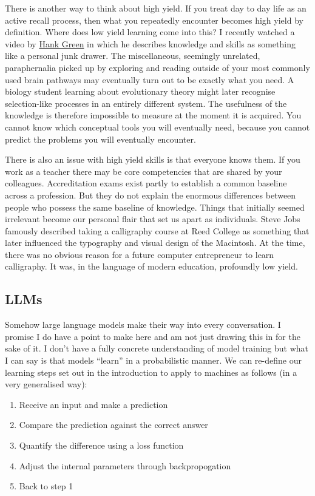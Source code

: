 \documentclass{article}
\begin{document}
There is another way to think about high yield. If you treat day to day life as an active recall process, then what you repeatedly encounter becomes high yield by definition. Where does low yield learning come into this? I recently watched a video by \href{https://www.youtube.com/watch?v=AgBaU9mmceQ}{Hank Green} in which he describes knowledge and skills as something like a personal junk drawer. The miscellaneous, seemingly unrelated, paraphernalia picked up by exploring and reading outside of your most commonly used brain pathways may eventually turn out to be exactly what you need. A biology student learning about evolutionary theory might later recognise selection-like processes in an entirely different system. The usefulness of the knowledge is therefore impossible to measure at the moment it is acquired. You cannot know which conceptual tools you will eventually need, because you cannot predict the problems you will eventually encounter. 

There is also an issue with high yield skills is that everyone knows them. If you work as a teacher there may be core competencies that are shared by your colleagues. Accreditation exams exist partly to establish a common baseline across a profession. But they do not explain the enormous differences between people who possess the same baseline of knowledge. Things that initially seemed irrelevant become our personal flair that set us apart as individuals. Steve Jobs famously described taking a calligraphy course at Reed College as something that later influenced the typography and visual design of the Macintosh. At the time, there was no obvious reason for a future computer entrepreneur to learn calligraphy. It was, in the language of modern education, profoundly low yield. 

\subsection*{LLMs}

Somehow large language models make their way into every conversation. I promise I do have a point to make here and am not just drawing this in for the sake of it. I don't have a fully concrete understanding of model training but what I can say is that models ``learn'' in a probabilistic manner. We can re-define our learning steps set out in the introduction to apply to machines as follows (in a very generalised way): 

\begin{enumerate}
	\item Receive an input and make a prediction
	\item Compare the prediction against the correct answer
	\item Quantify the difference using a loss function 
	\item Adjust the internal parameters through backpropogation 
	\item Back to step 1 
\end{enumerate}
\end{document}
